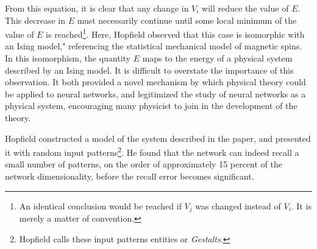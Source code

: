 \documentclass[11pt]{afthesis}
\begin{document}
\begin{equation}
	\end{equation} From this equation, it is clear that any change in \begin{math}V_i\end{math} will reduce the value  of \begin{math}E\end{math}. This decrease in \begin{math}E\end{math} must necessarily continue until some local minimum of the value of \begin{math}E\end{math} is reached\footnote{An identical conclusion would be reached if \begin{math}V_j\end{math} was changed instead of  \begin{math}V_i\end{math}. It is merely a matter of convention.}. Here, Hopfield observed that this case is isomorphic with an Ising model," referencing the statistical mechanical model of magnetic spins. In this isomorphism, the quantity \begin{math}E\end{math} maps to the energy of a physical system described by an Ising model. It is difficult to overstate the importance of this observation. It both provided a novel mechanism by which physical theory could be applied to neural networks, and legitimized the study of neural networks as a physical system, encouraging many physicist to join in the development of the theory.
	
	Hopfield constructed a model of the system described in the paper, and presented it with random input patterns\footnote{Hopfield calls these input patterns entities or \textit{Gestalts}.}. He found that the network can indeed recall a small number of patterns, on the order of approximately 15 percent of the network dimensionality, before the recall error becomes significant.
	
\end{document}
